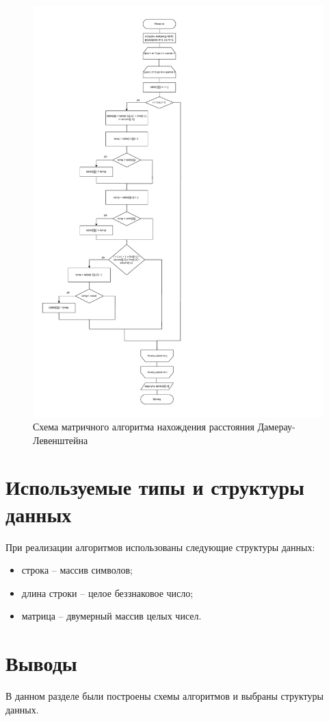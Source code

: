 \begin{figure}[h!]
	\centering
	\includegraphics[height=0.8\textheight]{tex_parts/scheme4.pdf}
	\caption{\label{fig:damItr}Схема матричного алгоритма нахождения расстояния Дамерау-Левенштейна}
\end{figure}

\clearpage

\section{Используемые типы и структуры данных}

При реализации алгоритмов использованы следующие структуры данных:

\begin{itemize}
	\item строка -- массив символов;
	\item длина строки -- целое беззнаковое число;
	\item матрица -- двумерный массив целых чисел.
\end{itemize}

\section{Выводы}

В данном разделе были построены схемы алгоритмов и выбраны структуры данных.

